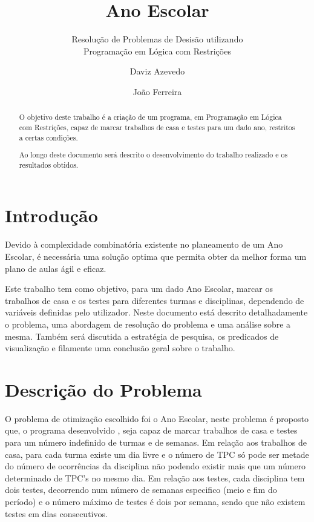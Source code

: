 \documentclass{llncs}
\begin{document}
%
\frontmatter          %
%
\pagestyle{headings}  %
%
\title{Ano Escolar}
\subtitle{Resolução de Problemas de Desisão utilizando\\
Programação em Lógica com Restrições}
%
%
\author{Daviz Azevedo \and João Ferreira}
%
%

\maketitle              %

\begin{abstract} %

O objetivo deste trabalho é a criação de um programa, em Programação em Lógica com Restrições, capaz de marcar trabalhos de casa e testes para um dado ano, restritos a certas condições.

Ao longo deste documento será descrito o desenvolvimento do trabalho realizado e os resultados obtidos.

\end{abstract}
%
\section{Introdução}
%
Devido à complexidade combinatória existente no planeamento de um Ano Escolar, é necessária uma solução optima que permita obter da melhor forma um plano de aulas ágil e eficaz.

Este trabalho tem como objetivo, para um dado Ano Escolar, marcar os trabalhos de casa e os testes para diferentes turmas e disciplinas, dependendo de variáveis definidas pelo utilizador.
Neste documento está descrito detalhadamente o problema, uma abordagem de resolução do problema e uma análise sobre a mesma. Também será discutida a estratégia de pesquisa, os predicados de visualização e filamente uma conclusão geral sobre o trabalho.


\section{Descrição do Problema}
%
O problema de otimização escolhido foi o Ano Escolar, neste problema é proposto que, o programa desenvolvido , seja capaz de marcar trabalhos de casa e testes para um número indefinido de turmas e de semanas. Em relação aos trabalhos de casa, para cada turma existe um dia livre e o número de TPC só pode ser metade do número de ocorrências da disciplina não podendo existir mais que um número determinado de TPC's no mesmo dia. Em relação aos testes, cada disciplina tem dois testes, decorrendo num número de semanas especifico (meio e fim do período) e o número máximo de testes é dois por semana, sendo que não existem testes em dias consecutivos.
\end{document}
